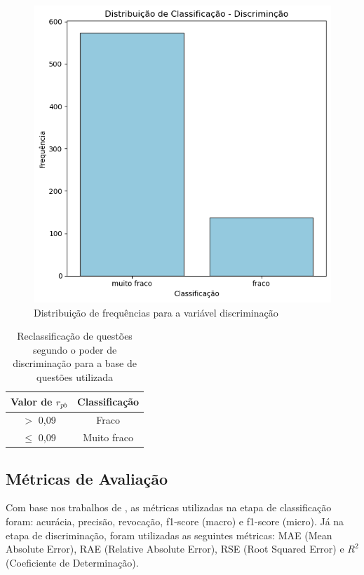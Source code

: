 \documentclass[12pt]{article}
\begin{document}
\begin{figure}
    \centering
    \includegraphics[width=0.62\linewidth]{Figures/Classification/2/Classificacao_Discriminacao.png}
    \caption{Distribuição de frequências para a variável discriminação}
    \label{fig:grafico_freq_discriminacao}
\end{figure}



\begin{table}[!h]
    \centering
\begin{small}    
    \caption{Reclassificação de questões segundo o poder de discriminação para a base de questões utilizada}
    \label{tab:discriminacao_prog}
    \begin{tabular}{cc}
        \toprule
        \textbf{Valor de $r_{pb}$} & \textbf{Classificação} \\
        \toprule
        $>$ 0,09 & Fraco \\
        $\le$ 0,09 & Muito fraco \\
        \bottomrule
    \end{tabular}
\end{small}
\end{table}


\subsection{Métricas de Avaliação}

Com base nos trabalhos de \cite{marcos2021,jackson2023}, as métricas utilizadas na etapa de classificação foram: acurácia, precisão, revocação, f1-score (macro) e f1-score (micro). Já na etapa de discriminação, foram utilizadas as seguintes métricas: MAE (Mean Absolute Error), RAE (Relative Absolute Error), RSE (Root Squared Error) e $R^2$ (Coeficiente de Determinação).
\end{document}
